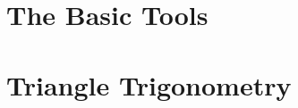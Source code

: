 \part{The Basic Tools}
\label{part:the_basic_tools}





\newpage

\part{Triangle Trigonometry}
\label{part:triangle_trigonometry}




\newpage
